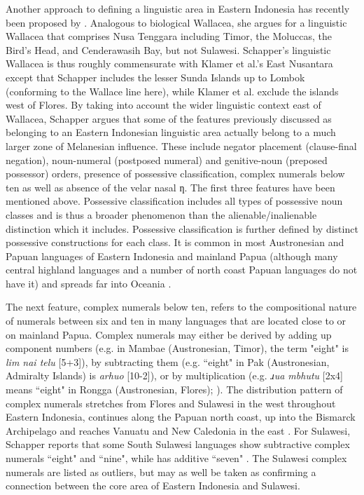 Another approach to defining a linguistic area in Eastern Indonesia has recently been proposed by \citet{schapper2015wallacea}. Analogous to biological Wallacea, she argues for a linguistic Wallacea that comprises Nusa Tenggara including Timor, the Moluccas, the Bird’s Head, and Cenderawasih Bay, but not Sulawesi. Schapper's linguistic Wallacea is thus roughly commensurate with Klamer et al.'s East Nusantara except that Schapper includes the lesser Sunda Islands up to Lombok (conforming to the Wallace line here), while Klamer et al. exclude the islands west of Flores. By taking into account the wider linguistic context east of Wallacea, Schapper argues that some of the features previously discussed as belonging to an Eastern Indonesian linguistic area actually belong to a much larger zone of Melanesian influence. These include negator placement (clause-final negation), noun-numeral (postposed numeral) and genitive-noun (preposed possessor) orders, presence of possessive classification, complex numerals below ten as well as absence of the velar nasal ƞ. The first three features have been mentioned above. Possessive classification includes all types of possessive noun classes and is thus a broader phenomenon than the alienable/inalienable distinction which it includes. Possessive classification is further defined by distinct possessive constructions for each class. It is common in most Austronesian and Papuan languages of Eastern Indonesia and mainland Papua (although many central highland languages and a number of north coast Papuan languages do not have it) and spreads far into Oceania \citep[109]{schapper2015wallacea}.

The next feature, complex numerals below ten, refers to the compositional nature of numerals between six and ten in many languages that are located close to or on mainland Papua. Complex numerals may either be derived by adding up component numbers (e.g. in Mambae (Austronesian, Timor), the term "eight" is \textit{lim nai telu} [5+3]), by subtracting them (e.g. ``eight" in Pak (Austronesian, Admiralty Islands) is \textit{arhuo} [10-2]), or by multiplication (e.g. \textit{ɹua mbhutu} [2x4] means ``eight" in Rongga (Austronesian, Flores); \citealt[113]{schapper2015wallacea}). The distribution pattern of complex numerals stretches from Flores and Sulawesi in the west throughout Eastern Indonesia, continues along the Papuan north coast, up into the Bismarck Archipelago and reaches Vanuatu and New Caledonia in the east \citep[112--4]{schapper2015wallacea}. For Sulawesi, Schapper reports that some South Sulawesi languages show subtractive complex numerals ``eight" and ``nine", while  has additive ``seven" \citep[113f.]{schapper2015wallacea}. The Sulawesi complex numerals are listed as outliers, but may as well be taken as confirming a connection between the core area of Eastern Indonesia and Sulawesi.

